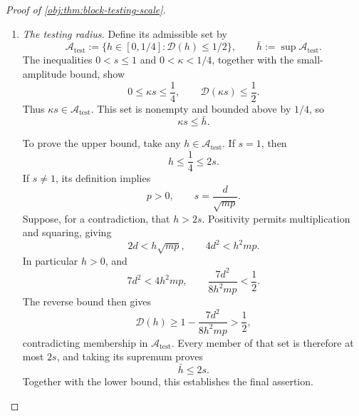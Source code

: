 \begin{proof}[Proof of \cref{obj:thm:block-testing-scale}]
\begin{enumerate}
\item \textit{The testing radius.}
Define its admissible set by
\[
\mathcal A_{\mathrm{test}}
:=
\{h\in[0,1/4]:\mathcal D(h)\le1/2\},
\qquad
\bar h:=\sup\mathcal A_{\mathrm{test}}.
\]
The inequalities \(0<s\le1\) and \(0<\kappa<1/4\), together with the small-amplitude bound, show
\[
0\le\kappa s\le\frac14,
\qquad
\mathcal D(\kappa s)\le\frac12.
\]
Thus \(\kappa s\in\mathcal A_{\mathrm{test}}\). This set is nonempty and bounded above by \(1/4\), so
\[
\kappa s\le\bar h.
\]

To prove the upper bound, take any \(h\in\mathcal A_{\mathrm{test}}\). If \(s=1\), then
\[
h\le\frac14\le2s.
\]
If \(s\ne1\), its definition implies
\[
p>0,\qquad s=\frac d{\sqrt{mp}}.
\]
Suppose, for a contradiction, that \(h>2s\). Positivity permits multiplication and squaring, giving
\[
2d<h\sqrt{mp},
\qquad
4d^2<h^2mp.
\]
In particular \(h>0\), and
\[
7d^2<4h^2mp,
\qquad
\frac{7d^2}{8h^2mp}<\frac12.
\]
The reverse bound then gives
\[
\mathcal D(h)
\ge1-\frac{7d^2}{8h^2mp}
>\frac12,
\]
contradicting membership in \(\mathcal A_{\mathrm{test}}\). Every member of that set is therefore at most \(2s\), and taking its supremum proves
\[
\bar h\le2s.
\]
Together with the lower bound, this establishes the final assertion.
\end{enumerate}
\end{proof}

